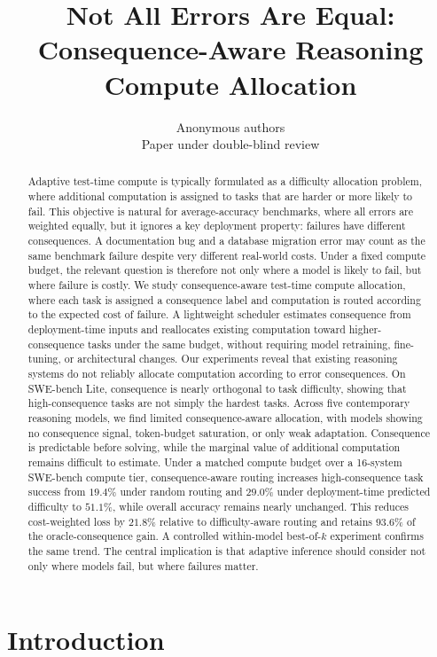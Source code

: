 \documentclass{article}
\title{Not All Errors Are Equal:\\Consequence-Aware Reasoning Compute Allocation}
\author{Anonymous authors\\
Paper under double-blind review}
\begin{document}
\maketitle
\begin{abstract}
Adaptive test-time compute is typically formulated as a difficulty
allocation problem, where additional computation is assigned to tasks
that are harder or more likely to fail. This objective is natural for
average-accuracy benchmarks, where all errors are weighted equally, but
it ignores a key deployment property: failures have different
consequences. A documentation bug and a database migration error may
count as the same benchmark failure despite very different real-world
costs. Under a fixed compute budget, the relevant question is therefore
not only where a model is likely to fail, but where failure is costly.
We study consequence-aware test-time compute allocation, where each task
is assigned a consequence label and computation is routed according to
the expected cost of failure. A lightweight scheduler estimates
consequence from deployment-time inputs and reallocates existing
computation toward higher-consequence tasks under the same budget,
without requiring model retraining, fine-tuning, or architectural
changes. Our experiments reveal that existing reasoning systems do not
reliably allocate computation according to error consequences. On
SWE-bench Lite, consequence is nearly orthogonal to task difficulty,
showing that high-consequence tasks are not simply the hardest tasks.
Across five contemporary reasoning models, we find limited
consequence-aware allocation, with models showing no consequence
signal, token-budget saturation, or only weak adaptation. Consequence is
predictable before solving, while the marginal value of additional
computation remains difficult to estimate. Under a matched compute
budget over a 16-system SWE-bench compute tier, consequence-aware
routing increases high-consequence task success from $19.4\%$ under
random routing and $29.0\%$ under deployment-time predicted difficulty
to $51.1\%$, while overall accuracy remains nearly unchanged. This
reduces cost-weighted loss by $21.8\%$ relative to difficulty-aware
routing and retains $93.6\%$ of the oracle-consequence gain. A
controlled within-model best-of-$k$ experiment confirms the same trend.
The central implication is
that adaptive inference should consider not only where models fail, but
where failures matter.
\end{abstract}


\section{Introduction}
\label{sec:intro}
\end{document}
